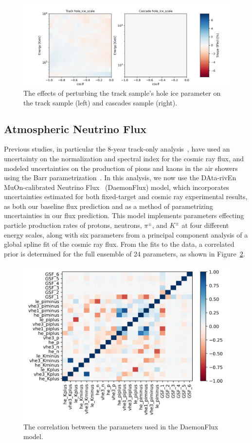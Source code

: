 \documentclass[main.tex]{subfiles}
\begin{document}
\begin{figure}
    \centering
    \includegraphics[width=0.8\linewidth]{figures/systematics/hole_ice_scale.png}
    \caption{The effects of perturbing the track sample's hole ice parameter on the track sample (left) and cascades sample (right).}\label{fig:track_hole}
\end{figure}

\subsection{Atmospheric Neutrino Flux}
Previous studies, in particular the 8-year track-only analysis~\cite{Aartsen_2020,Aartsen_2020_prd}, have used an uncertainty on the normalization and spectral index for the cosmic ray flux, and modeled uncertainties on the production of pions and kaons in the air showers using the Barr parametrization~\cite{PhysRevD.74.094009}. 
In this analysis, we now use the DAta-rivEn MuOn-calibrated Neutrino Flux~\cite{yanez2023daemonflux} (DaemonFlux) model, which incorporates uncertainties estimated for both fixed-target and cosmic ray experimental results, as both our baseline flux prediction and as a method of parametrizing uncertainties in our flux prediction. 
This model implements parameters effecting particle production rates of protons, neutrons, $\pi^{\pm}$, and $K^{\pm}$ at four different energy scales, along with six parameters from a principal component analysis of a global spline fit of the cosmic ray flux. 
From the fits to the data, a correlated prior is determined for the full ensemble of 24 parameters, as shown in Figure~\ref{fig:daemon_cor}.
\begin{figure}
    \centering
    \includegraphics[width=0.7\linewidth]{figures/daemon_cov.png}
    \caption{The correlation between the parameters used in the DaemonFlux model.}\label{fig:daemon_cor}
\end{figure}
\end{document}
